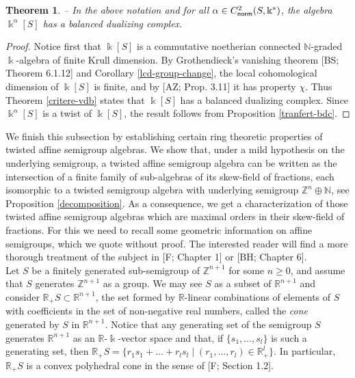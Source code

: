 \documentclass[twoside,11pt]{article}
\newcommand{\norm}{{\sf norm}}
\renewcommand{\k}{\Bbbk}
\newcommand{\N}{{\mathbb N}}
\newcommand{\Z}{{\mathbb Z}}
\newcommand{\RR}{{\mathbb R}}
\newtheorem{subtheorem}{Theorem}[subsection]
\begin{document}
\begin{subtheorem} -- \label{thm-dc-tasa}
In the above notation and for all $\alpha \in C^2_\norm(S,\k^*)$, the algebra
$\k^\alpha[S]$ has a balanced dualizing complex.
\end{subtheorem}

\begin{proof} Notice first that $\k[S]$ is a commutative noetherian connected $\N$-graded
$\k$-algebra of finite Krull dimension. By Grothendieck's vanishing theorem [BS; Theorem 
6.1.12] and Corollary \ref{lcd-group-change}, the local cohomological dimension of $\k[S]$ is
finite, and by [AZ; Prop. 3.11] it has property $\chi$. Thus Theorem \ref{critere-vdb} 
states that $\k[S]$ has a balanced dualizing complex. Since $\k^\alpha[S]$
is a twist of $\k[S]$, the result follows from Proposition \ref{tranfert-bdc}. \end{proof}

We finish this subsection by establishing certain ring theoretic properties of twisted
affine semigroup algebras. We show that, under a mild hypothesis on the underlying
semigroup, a twisted affine semigroup algebra can be written as the intersection of a
finite family of sub-algebras of its skew-field of fractions, each isomorphic to a twisted
semigroup algebra with underlying semigroup $\Z^n \oplus \N$, see Proposition
\ref{decomposition}. As a consequence, we get a characterization of those twisted affine
semigroup algebras which are maximal orders in their skew-field of fractions. For this we
need to recall some geometric information on affine semigroups, which we quote without
proof. The interested reader will find a more thorough treatment of the subject in [F;
Chapter 1] or [BH; Chapter 6].\\

Let $S$ be a finitely generated sub-semigroup of $\Z^{n+1}$ for some $n\geq 0$, and assume
that $S$ generates $\Z^{n+1}$ as a group. We may see $S$ as a subset of $\RR^{n+1}$
and consider $\RR_+ S \subset \RR^{n+1}$, the set formed by $\RR$-linear combinations of
elements of $S$ with coefficients in the set of non-negative real numbers, called
the \emph{cone} generated by $S$ in $\RR^{n+1}$. Notice that any generating set of the
semigroup $S$ generates $\RR^{n+1}$ as an $\RR$-$\k$-vector space and that, if
$\{s_1,\dots,s_l\}$ is such a generating set, then $\RR_+S = \{r_1s_1 + \ldots + r_ls_l
\mid (r_1,\dots,r_l)\in\RR_+^l\}$. In particular, $\RR_+S$ is a convex polyhedral cone in
the sense of [F; Section 1.2].
\end{document}
